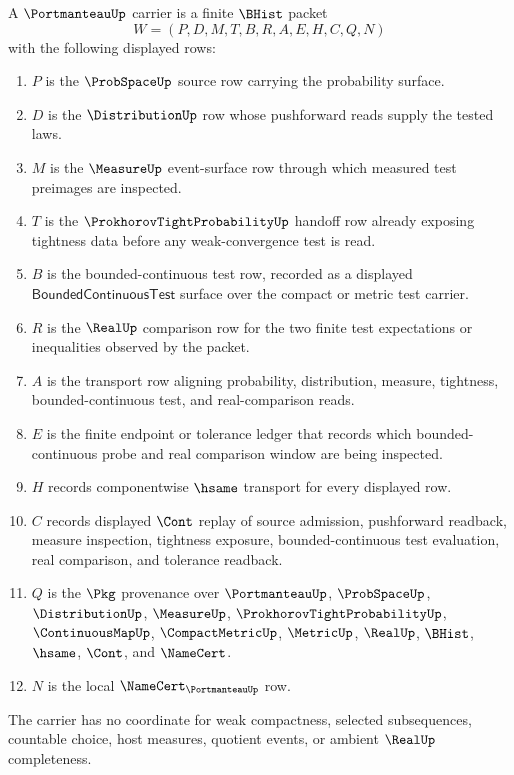\begin{definition}
\label{def:portmanteau-carrier}
A $\PortmanteauUp$ carrier is a finite $\BHist$ packet
$$
W=(P,D,M,T,B,R,A,E,H,C,Q,N)
$$
with the following displayed rows:
\begin{enumerate}
\item $P$ is the $\ProbSpaceUp$ source row carrying the probability surface.
\item $D$ is the $\DistributionUp$ row whose pushforward reads supply the tested laws.
\item $M$ is the $\MeasureUp$ event-surface row through which measured test preimages are inspected.
\item $T$ is the $\ProkhorovTightProbabilityUp$ handoff row already exposing tightness data before any weak-convergence test is read.
\item $B$ is the bounded-continuous test row, recorded as a displayed $\mathsf{BoundedContinuousTest}$ surface over the compact or metric test carrier.
\item $R$ is the $\RealUp$ comparison row for the two finite test expectations or inequalities observed by the packet.
\item $A$ is the transport row aligning probability, distribution, measure, tightness, bounded-continuous test, and real-comparison reads.
\item $E$ is the finite endpoint or tolerance ledger that records which bounded-continuous probe and real comparison window are being inspected.
\item $H$ records componentwise $\hsame$ transport for every displayed row.
\item $C$ records displayed $\Cont$ replay of source admission, pushforward readback, measure inspection, tightness exposure, bounded-continuous test evaluation, real comparison, and tolerance readback.
\item $Q$ is the $\Pkg$ provenance over $\PortmanteauUp$, $\ProbSpaceUp$, $\DistributionUp$, $\MeasureUp$, $\ProkhorovTightProbabilityUp$, $\ContinuousMapUp$, $\CompactMetricUp$, $\MetricUp$, $\RealUp$, $\BHist$, $\hsame$, $\Cont$, and $\NameCert$.
\item $N$ is the local $\NameCert_{\PortmanteauUp}$ row.
\end{enumerate}
The carrier has no coordinate for weak compactness, selected subsequences, countable choice, host measures, quotient events, or ambient $\RealUp$ completeness.
\end{definition}

